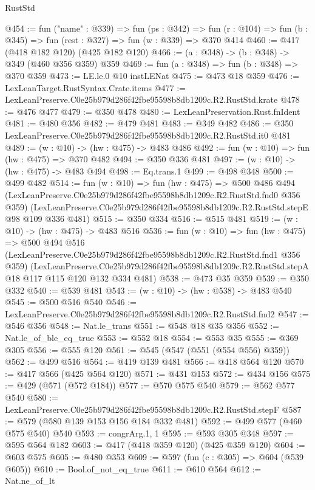 \begin{lexlean}{RustStd}
\begin{coremodule}
@454 := fun ("name" : @339) =>
  fun (ps : @342) =>
  fun (r : @104) => fun (b : @345) => fun (rest : @327) => fun (w : @339) => @370 @414
@460 := @417 (@418 @182 @120) (@425 @182 @120)
@466 := (a : @348) -> (b : @348) -> @349 (@460 @356 @359) @359
@469 := fun (a : @348) => fun (b : @348) => @370 @359
@473 := LE.le.{0} @10 instLENat
@475 := @473 @18 @359
@476 := LexLeanTarget.RustSyntax.Crate.items
@477 := LexLeanPreserve.C0e25b979d286f42fbe95598b8db1209c.R2.RustStd.krate
@478 := @476 @477
@479 := @350 @478
@480 := LexLeanPreservation.Rust.fnIdent
@481 := @480 @356
@482 := @479 @481
@483 := @349 @482
@486 := @350 LexLeanPreserve.C0e25b979d286f42fbe95598b8db1209c.R2.RustStd.it0 @481
@489 := (w : @10) -> (hw : @475) -> @483 @486
@492 := fun (w : @10) => fun (hw : @475) => @370 @482
@494 := @350 @336 @481
@497 := (w : @10) -> (hw : @475) -> @483 @494
@498 := Eq.trans.{1}
@499 := @498 @348
@500 := @499 @482
@514 := fun (w : @10) =>
  fun (hw : @475) =>
  @500
    @486
    @494
    (LexLeanPreserve.C0e25b979d286f42fbe95598b8db1209c.R2.RustStd.fnd0 @356 @359)
    (LexLeanPreserve.C0e25b979d286f42fbe95598b8db1209c.R2.RustStd.stepE @98 @109 @336 @481)
@515 := @350 @334
@516 := @515 @481
@519 := (w : @10) -> (hw : @475) -> @483 @516
@536 := fun (w : @10) =>
  fun (hw : @475) =>
  @500
    @494
    @516
    (LexLeanPreserve.C0e25b979d286f42fbe95598b8db1209c.R2.RustStd.fnd1 @356 @359)
    (LexLeanPreserve.C0e25b979d286f42fbe95598b8db1209c.R2.RustStd.stepA
      @18
      @117
      @115
      @120
      @132
      @334
      @481)
@538 := @473 @35 @359
@539 := @350 @332
@540 := @539 @481
@543 := (w : @10) -> (hw : @538) -> @483 @540
@545 := @500 @516 @540
@546 := LexLeanPreserve.C0e25b979d286f42fbe95598b8db1209c.R2.RustStd.fnd2
@547 := @546 @356
@548 := Nat.le_trans
@551 := @548 @18 @35 @356
@552 := Nat.le_of_ble_eq_true
@553 := @552 @18
@554 := @553 @35
@555 := @369 @305
@556 := @555 @120
@561 := @545 (@547 (@551 (@554 @556) @359))
@562 := @499 @516
@564 := @419 @139 @481
@566 := @418 @564 @120
@570 := @417 @566 (@425 @564 @120)
@571 := @431 @153
@572 := @434 @156
@575 := @429 (@571 (@572 @184))
@577 := @570 @575 @540
@579 := @562 @577 @540
@580 := LexLeanPreserve.C0e25b979d286f42fbe95598b8db1209c.R2.RustStd.stepF
@587 := @579 (@580 @139 @153 @156 @184 @332 @481)
@592 := @499 @577 (@460 @575 @540) @540
@593 := congrArg.{1, 1}
@595 := @593 @305 @348
@597 := @595 @564 @182
@603 := @417 (@418 @359 @120) (@425 @359 @120)
@604 := @603 @575
@605 := @480 @353
@609 := @597 (fun (c : @305) => @604 (@539 @605))
@610 := Bool.of_not_eq_true
@611 := @610 @564
@612 := Nat.ne_of_lt

\end{coremodule}
\end{lexlean}
